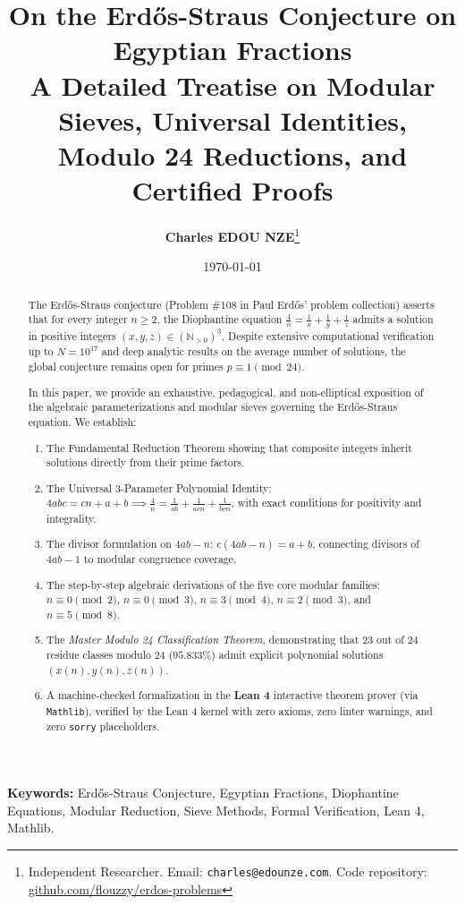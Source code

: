\documentclass[11pt,a4paper]{article}
\title{\textbf{\Large On the Erd\H{o}s-Straus Conjecture on Egyptian Fractions}\\[0.5em]
\large A Detailed Treatise on Modular Sieves, Universal Identities, Modulo 24 Reductions, and Certified Proofs}
\author{\textbf{Charles EDOU NZE}\thanks{Independent Researcher. Email: \texttt{charles@edounze.com}. Code repository: \href{https://github.com/flouzzy/erdos-problems}{github.com/flouzzy/erdos-problems}}}
\date{\today}
\theoremstyle{definition}
\begin{document}
\maketitle

\begin{abstract}
The Erd\H{o}s-Straus conjecture (Problem \#108 in Paul Erd\H{o}s' problem collection) asserts that for every integer $n \ge 2$, the Diophantine equation $\frac{4}{n} = \frac{1}{x} + \frac{1}{y} + \frac{1}{z}$ admits a solution in positive integers $(x, y, z) \in (\mathbb{N}_{>0})^3$. Despite extensive computational verification up to $N = 10^{17}$ and deep analytic results on the average number of solutions, the global conjecture remains open for primes $p \equiv 1 \pmod{24}$.

In this paper, we provide an exhaustive, pedagogical, and non-elliptical exposition of the algebraic parameterizations and modular sieves governing the Erd\H{o}s-Straus equation. We establish:
\begin{enumerate}
    \item The Fundamental Reduction Theorem showing that composite integers inherit solutions directly from their prime factors.
    \item The Universal 3-Parameter Polynomial Identity: $4abc = cn + a + b \implies \frac{4}{n} = \frac{1}{ab} + \frac{1}{acn} + \frac{1}{bcn}$, with exact conditions for positivity and integrality.
    \item The divisor formulation on $4ab - n$: $c(4ab - n) = a + b$, connecting divisors of $4ab - 1$ to modular congruence coverage.
    \item The step-by-step algebraic derivations of the five core modular families: $n \equiv 0 \pmod 2$, $n \equiv 0 \pmod 3$, $n \equiv 3 \pmod 4$, $n \equiv 2 \pmod 3$, and $n \equiv 5 \pmod 8$.
    \item The \emph{Master Modulo 24 Classification Theorem}, demonstrating that 23 out of 24 residue classes modulo 24 ($95.833\%$) admit explicit polynomial solutions $(x(n), y(n), z(n))$.
    \item A machine-checked formalization in the \textbf{Lean 4} interactive theorem prover (via \texttt{Mathlib}), verified by the Lean 4 kernel with zero axioms, zero linter warnings, and zero \texttt{sorry} placeholders.
\end{enumerate}
\end{abstract}

\vspace{0.5em}
\noindent\textbf{Keywords:} Erd\H{o}s-Straus Conjecture, Egyptian Fractions, Diophantine Equations, Modular Reduction, Sieve Methods, Formal Verification, Lean 4, Mathlib.
\end{document}
